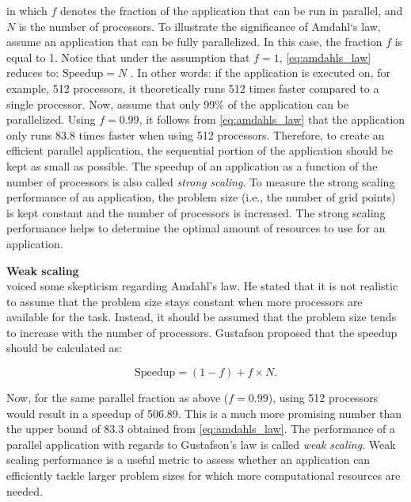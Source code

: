 \noindent in which $f$ denotes the fraction of the application that can be run in parallel, and $N$ is the number of processors. To illustrate the significance of Amdahl`s law, assume an application that can be fully parallelized. In this case, the fraction $f$ is equal to 1. Notice that under the assumption that $f=1$, \autoref{eq:amdahls_law} reduces to: $\text{Speedup} = N$ . In other words: if the application is executed on, for example, 512 processors, it theoretically runs 512 times faster compared to a single processor. Now, assume that only 99\% of the application can be parallelized. Using $f=0.99$, it follows from \autoref{eq:amdahls_law} that the application only runs 83.8 times faster when using 512 processors. Therefore, to create an efficient parallel application, the sequential portion of the application should be kept as small as possible. The speedup of an application as a function of the number of processors is also called \emph{strong scaling}. To measure the strong scaling performance of an application, the problem size (i.e., the number of grid points) is kept constant and the number of processors is increased. The strong scaling performance helps to determine the optimal amount of resources to use for an application.

\noindent \textbf{Weak scaling} \\
\cite{gustafsonReevaluatingAmdahlLaw1988} voiced some skepticism regarding Amdahl's law. He stated that it is not realistic to assume that the problem size stays constant when more processors are available for the task. Instead, it should be assumed that the problem size tends to increase with the number of processors. Gustafson proposed that the speedup should be calculated as:

\begin{equation}
    \text{Speedup} = (1-f) + f \times N.
    \label{eq:gustafsons_law}
\end{equation}

\noindent Now, for the same parallel fraction as above ($f=0.99$), using 512 processors would result in a speedup of 506.89. This is a much more promising number than the upper bound of 83.3 obtained from \autoref{eq:amdahls_law}. The performance of a parallel application with regards to Gustafson's law is called \emph{weak scaling}. Weak scaling performance is a useful metric to assess whether an application can efficiently tackle larger problem sizes for which more computational resources are needed.

